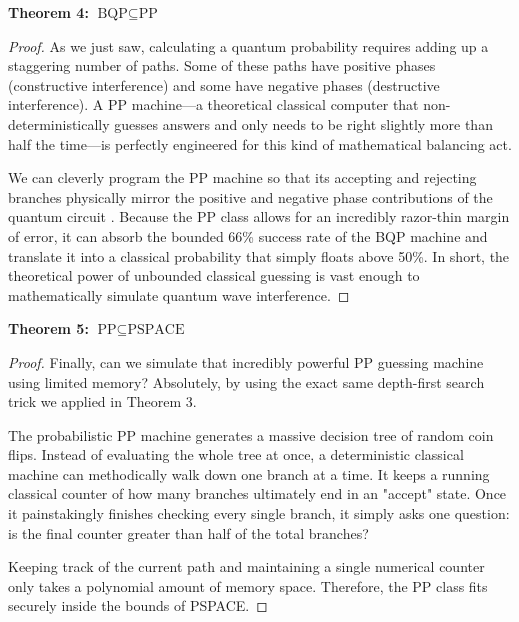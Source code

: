 \textbf{Theorem 4:} $\text{BQP} \subseteq \text{PP}$
\begin{proof}
As we just saw, calculating a quantum probability requires adding up a staggering number of paths. 
Some of these paths have positive phases (constructive interference) and some have negative phases (destructive interference). 
A PP machine—a theoretical classical computer that non-deterministically guesses answers and only needs to be right slightly more than half the time—is perfectly engineered for this kind of mathematical balancing act.

We can cleverly program the PP machine so that its accepting and rejecting branches physically mirror the positive and negative phase contributions of the quantum circuit \cite{adleman1997}. 
Because the PP class allows for an incredibly razor-thin margin of error, it can absorb the bounded 66\% success rate of the BQP machine and translate it into a classical probability that simply floats above 50\%. 
In short, the theoretical power of unbounded classical guessing is vast enough to mathematically simulate quantum wave interference.
\end{proof}

\textbf{Theorem 5:} $\text{PP} \subseteq \text{PSPACE}$
\begin{proof}
Finally, can we simulate that incredibly powerful PP guessing machine using limited memory? 
Absolutely, by using the exact same depth-first search trick we applied in Theorem 3. 

The probabilistic PP machine generates a massive decision tree of random coin flips. 
Instead of evaluating the whole tree at once, a deterministic classical machine can methodically walk down one branch at a time. 
It keeps a running classical counter of how many branches ultimately end in an "accept" state. 
Once it painstakingly finishes checking every single branch, it simply asks one question: is the final counter greater than half of the total branches? 

Keeping track of the current path and maintaining a single numerical counter only takes a polynomial amount of memory space. 
Therefore, the PP class fits securely inside the bounds of PSPACE.
\end{proof}